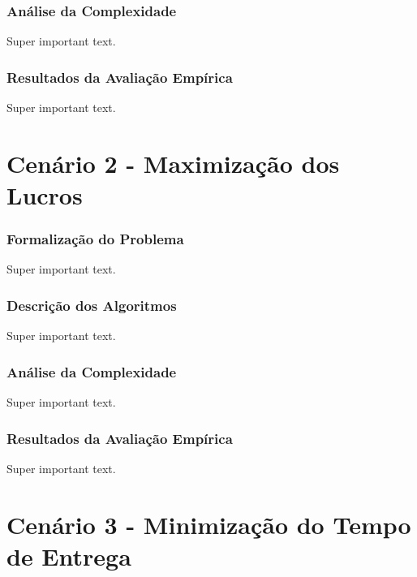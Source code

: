 \documentclass{beamer}
\begin{document}
\begin{frame}
  \frametitle{Análise da Complexidade}
  Super important text.
\end{frame}

\begin{frame}
  \frametitle{Resultados da Avaliação Empírica}
  Super important text.
\end{frame}








\section{Cenário 2 - Maximização dos Lucros}

\begin{frame}
  \frametitle{Formalização do Problema}
  Super important text.
\end{frame}

\begin{frame}
  \frametitle{Descrição dos Algoritmos}
  Super important text.
\end{frame}

\begin{frame}
  \frametitle{Análise da Complexidade}
  Super important text.
\end{frame}

\begin{frame}
  \frametitle{Resultados da Avaliação Empírica}
  Super important text.
\end{frame}








\section{Cenário 3 - Minimização do Tempo de Entrega}
\end{document}
